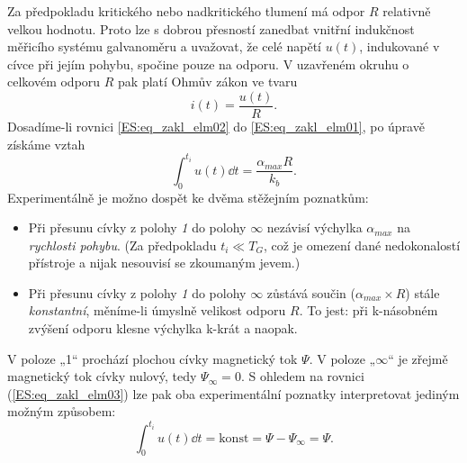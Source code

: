       
      Za předpokladu kritického nebo nadkritického tlumení má odpor \(R\) relativně velkou hodnotu. 
      Proto lze s dobrou přesností zanedbat vnitřní indukčnost měřicího systému galvanoměru a 
      uvažovat, že celé napětí \(u(t)\), indukované v cívce při jejím pohybu, spočine pouze na 
      odporu. V uzavřeném okruhu o celkovém odporu \(R\) pak platí Ohmův zákon ve tvaru
      \begin{equation}\label{ES:eq_zakl_elm02}
        i(t)=\frac{u(t)}{R}.
      \end{equation}    
      Dosadíme-li rovnici \ref{ES:eq_zakl_elm02} do \ref{ES:eq_zakl_elm01}, po úpravě získáme vztah
      \begin{equation}\label{ES:eq_zakl_elm03}
       \int_0^{t_i}u(t)\dd{t}=\frac{\alpha_{max}R}{k_b}.
      \end{equation}     
      Experimentálně je možno dospět ke dvěma stěžejním poznatkům:
      \begin{itemize}
        \item Při přesunu cívky z polohy \emph{1} do polohy \(\infty\) nezávisí výchylka
              \(\alpha_{max}\) na \emph{rychlosti pohybu}. (Za předpokladu \(t_i\ll T_G\), což je
              omezení dané nedokonalostí přístroje a nijak nesouvisí se zkoumaným jevem.)
        \item Při přesunu cívky z polohy \emph{1} do polohy \(\infty\) zůstává součin
              (\(\alpha_{max}\times R\)) stále \emph{konstantní}, měníme-li úmyslně velikost odporu
              \(R\). To jest: při k-násobném zvýšení odporu klesne výchylka k-krát a naopak. 
      \end{itemize}
  
      V poloze „1“ prochází plochou cívky magnetický tok \(\Psi\). V poloze „\(\infty\)“ je zřejmě
      magnetický tok cívky nulový, tedy \(\Psi_\infty = 0\). S ohledem na rovnici
      (\ref{ES:eq_zakl_elm03}) lze pak oba experimentální poznatky interpretovat jediným možným
      způsobem:
       \begin{equation}\label{ES:eq_zakl_elm04}
       \int_0^{t_i}u(t)\dd{t}=\text{konst}=\Psi-\Psi_\infty=\Psi.
      \end{equation}    

